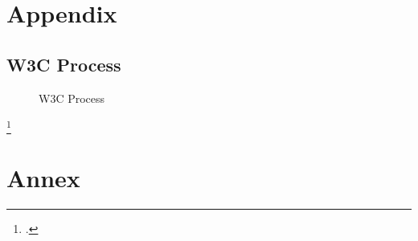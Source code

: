 \appendix

\chapter{Appendix}

\section{W3C Process}
\label{sec:w3c-process}

\begin{figure}[hbt]
	\centering
	
	\caption[W3C Process]{W3C Process\footnotemark}
	\label{fig:w3c}
\end{figure}
\footcitetext[Source:][Chapter 6.7]{w3c-process}

\chapter{Annex}

